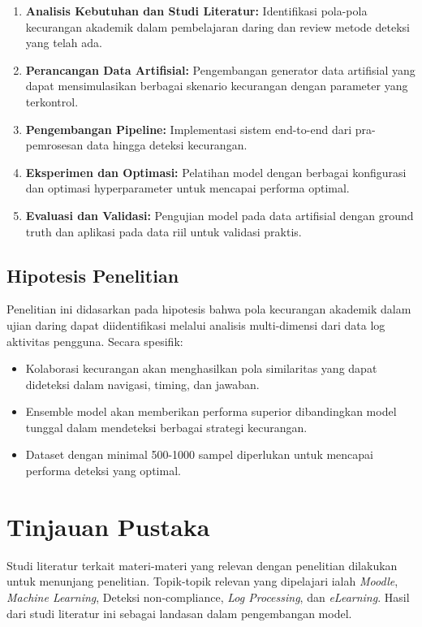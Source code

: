 \begin{enumerate}
    \item \textbf{Analisis Kebutuhan dan Studi Literatur:} Identifikasi pola-pola kecurangan akademik dalam pembelajaran daring dan review metode deteksi yang telah ada.
    
    \item \textbf{Perancangan Data Artifisial:} Pengembangan generator data artifisial yang dapat mensimulasikan berbagai skenario kecurangan dengan parameter yang terkontrol.
    
    \item \textbf{Pengembangan Pipeline:} Implementasi sistem end-to-end dari pra-pemrosesan data hingga deteksi kecurangan.
    
    \item \textbf{Eksperimen dan Optimasi:} Pelatihan model dengan berbagai konfigurasi dan optimasi hyperparameter untuk mencapai performa optimal.
    
    \item \textbf{Evaluasi dan Validasi:} Pengujian model pada data artifisial dengan ground truth dan aplikasi pada data riil untuk validasi praktis.
\end{enumerate}

\subsection{Hipotesis Penelitian}
Penelitian ini didasarkan pada hipotesis bahwa pola kecurangan akademik dalam ujian daring dapat diidentifikasi melalui analisis multi-dimensi dari data log aktivitas pengguna. Secara spesifik:
\begin{itemize}
    \item Kolaborasi kecurangan akan menghasilkan pola similaritas yang dapat dideteksi dalam navigasi, timing, dan jawaban.
    \item Ensemble model akan memberikan performa superior dibandingkan model tunggal dalam mendeteksi berbagai strategi kecurangan.
    \item Dataset dengan minimal 500-1000 sampel diperlukan untuk mencapai performa deteksi yang optimal.
\end{itemize}

\section{Tinjauan Pustaka}
\label{sec:tinjauanPustaka}
Studi literatur terkait materi-materi yang relevan dengan penelitian dilakukan untuk menunjang penelitian. Topik-topik relevan yang dipelajari ialah \textit{Moodle}, \textit{Machine Learning}, Deteksi non-compliance, \textit{Log Processing}, dan \textit{eLearning}. Hasil dari studi literatur ini sebagai landasan dalam pengembangan model.


